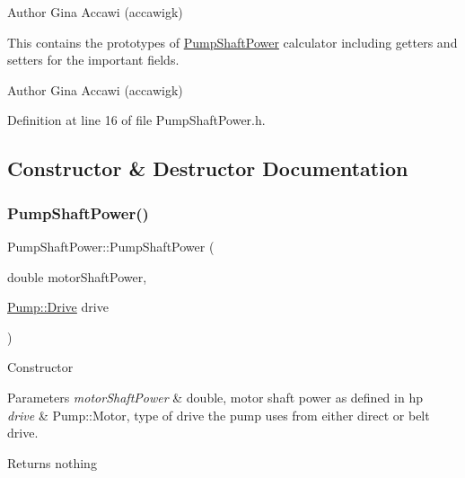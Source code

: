 \begin{DoxyAuthor}{Author}
Gina Accawi (accawigk) 
\end{DoxyAuthor}


This contains the prototypes of \hyperlink{class_pump_shaft_power}{Pump\+Shaft\+Power} calculator including getters and setters for the important fields.

\begin{DoxyAuthor}{Author}
Gina Accawi (accawigk) 
\end{DoxyAuthor}


Definition at line 16 of file Pump\+Shaft\+Power.\+h.



\subsection{Constructor \& Destructor Documentation}
\mbox{\label{class_pump_shaft_power_a84d04978ce410d544a4c8d9eb393c92d}} 
\subsubsection{\texorpdfstring{Pump\+Shaft\+Power()}{PumpShaftPower()}\hspace{0.1cm}{\footnotesize\ttfamily [1/3]}}
{\footnotesize\ttfamily Pump\+Shaft\+Power\+::\+Pump\+Shaft\+Power (\begin{DoxyParamCaption}\item[{double}]{motor\+Shaft\+Power,  }\item[{\hyperlink{class_pump_a32bf0ade131a11bb3b3fb374f638e983}{Pump\+::\+Drive}}]{drive }\end{DoxyParamCaption})\hspace{0.3cm}{\ttfamily [inline]}}

Constructor 
\begin{DoxyParams}{Parameters}
{\em motor\+Shaft\+Power} & double, motor shaft power as defined in hp \\
\hline
{\em drive} & Pump\+::\+Motor, type of drive the pump uses from either direct or belt drive. \\
\hline
\end{DoxyParams}
\begin{DoxyReturn}{Returns}
nothing 
\end{DoxyReturn}


